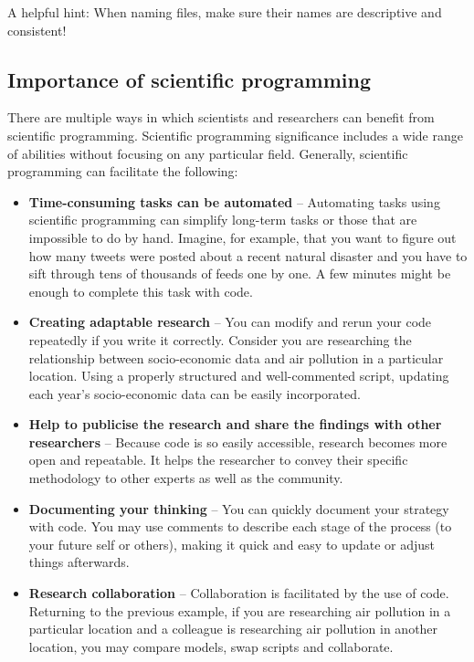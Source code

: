 \documentclass[
]{book}
\providecommand{\tightlist}{%
  \setlength{\itemsep}{0pt}\setlength{\parskip}{0pt}}
\begin{document}
A helpful hint: When naming files, make sure their names are descriptive and consistent!

\hypertarget{importance-of-scientific-programming}{%
\subsection*{Importance of scientific programming}\label{importance-of-scientific-programming}}

There are multiple ways in which scientists and researchers can benefit from scientific programming. Scientific programming significance includes a wide range of abilities without focusing on any particular field. Generally, scientific programming can facilitate the following:

\begin{itemize}
\tightlist
\item
  \textbf{Time-consuming tasks can be automated} -- Automating tasks using scientific programming can simplify long-term tasks or those that are impossible to do by hand. Imagine, for example, that you want to figure out how many tweets were posted about a recent natural disaster and you have to sift through tens of thousands of feeds one by one. A few minutes might be enough to complete this task with code.
\item
  \textbf{Creating adaptable research} -- You can modify and rerun your code repeatedly if you write it correctly. Consider you are researching the relationship between socio-economic data and air pollution in a particular location. Using a properly structured and well-commented script, updating each year's socio-economic data can be easily incorporated.
\item
  \textbf{Help to publicise the research and share the findings with other researchers} -- Because code is so easily accessible, research becomes more open and repeatable. It helps the researcher to convey their specific methodology to other experts as well as the community.
\item
  \textbf{Documenting your thinking} -- You can quickly document your strategy with code. You may use comments to describe each stage of the process (to your future self or others), making it quick and easy to update or adjust things afterwards.
\item
  \textbf{Research collaboration} -- Collaboration is facilitated by the use of code. Returning to the previous example, if you are researching air pollution in a particular location and a colleague is researching air pollution in another location, you may compare models, swap scripts and collaborate.
\end{itemize}
\end{document}
